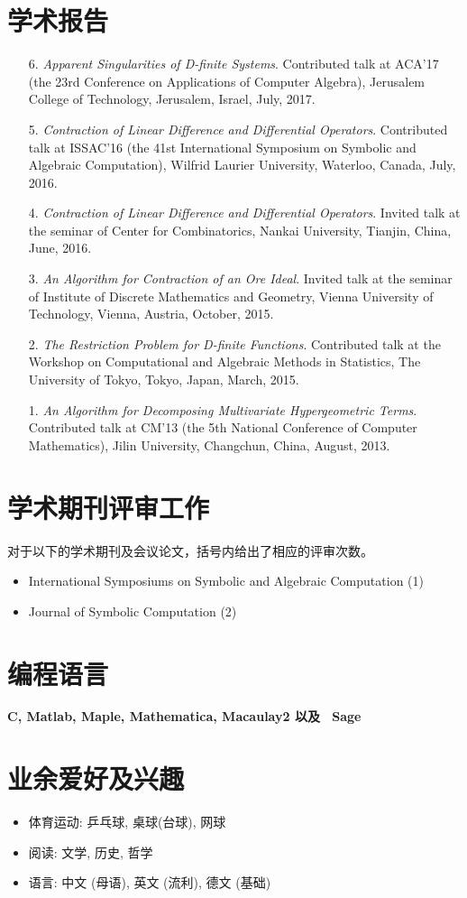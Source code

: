 \documentclass[a4paper,12pt]{article}
\begin{document}
\begin{CJK*}{UTF8}{gbsn}
\section*{\Large{学术报告}}
\begin{itemize}
 \item[6.] {\em Apparent Singularities of D-finite Systems}. Contributed talk at ACA'17 
 (the 23rd Conference on Applications of Computer Algebra), Jerusalem College of Technology, Jerusalem, Israel, July, 2017.
 \item[5.] {\em Contraction of Linear Difference and Differential Operators}. Contributed talk at ISSAC'16 
 (the 41st International Symposium on Symbolic and Algebraic Computation), Wilfrid Laurier University, Waterloo, Canada, July, 2016.
 \item[4.] {\em Contraction of Linear Difference and Differential Operators}.
       Invited talk at the seminar of Center for Combinatorics, Nankai University, Tianjin, China, June, 2016.
 \item[3.] {\em An Algorithm for Contraction of an Ore Ideal}. Invited talk at the seminar of Institute of Discrete Mathematics and Geometry, 
       Vienna University of Technology, Vienna, Austria, October, 2015.
 \item[2.] {\em The Restriction Problem for D-finite Functions}. 
       Contributed talk at the Workshop on Computational and Algebraic Methods in Statistics,
       The University of Tokyo, Tokyo, Japan, March, 2015.
 \item[1.] {\em An Algorithm for Decomposing Multivariate Hypergeometric Terms}. Contributed talk at CM'13
       (the 5th National Conference of Computer Mathematics), Jilin University, Changchun, China, August, 2013.
\end{itemize}

\section*{\Large 学术期刊评审工作}
对于以下的学术期刊及会议论文，括号内给出了相应的评审次数。
\begin{itemize}
 \item International Symposiums on Symbolic and Algebraic Computation (1)
 \item Journal of Symbolic Computation (2)
\end{itemize}

\section*{\Large{编程语言}}
\vspace{.05in}
{\bf C, Matlab, Maple, Mathematica, Macaulay2 以及 \ Sage}

\section*{\Large{业余爱好及兴趣}}
\begin{itemize}
 \item 体育运动: 乒乓球, 桌球(台球), 网球
 \item 阅读: 文学, 历史, 哲学
 \item 语言: 中文 (母语), 英文 (流利), 德文 (基础)
\end{itemize}

\end{CJK*}
\end{document}
